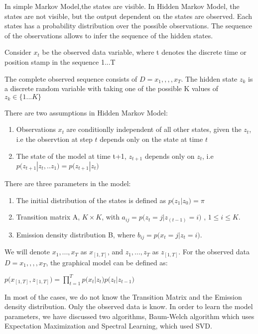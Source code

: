 \documentclass{article} %
\begin{document}
In simple Markov Model,the states are visible. In Hidden Markov Model, the states are not visible, but the output dependent on the states are observed. Each states has a probability distribution over the possible observations. The sequence of the observations allows to infer the sequence of the hidden states. 

Consider \(x_t\) be the observed data variable, where t denotes the discrete time or position stamp in the sequence 1...T

The complete observed sequence consists of \(D ={x_1,,,,x_T}\). The hidden state \(z_k\) is a discrete random variable with taking one of the possible K values of \(z_k \in \{1...K\}\)

There are two assumptions in Hidden Markov Model:
\begin{enumerate}
\item Observations $x_t$ are conditionlly independent of all other states, given the \(z_t\), i.e the observtion at step \(t\) depends only on the state at time \(t\)
\item The state of the model at time t+1, \(z_{t+1}\) depends only on \(z_t\), i.e 
\( p\big(z_{t+1}|z_t,..z_1\big) = p\big(z_{t+1}|z_t\big) \)
\end{enumerate}

There are three parameters in the model:
\begin{enumerate}
\item The initial distribution of the states is defined as \(p\big(z_1|z_0 \big) = \pi\)
\item Transition matrix A, \(K \times K \), with \(a_{ij} = p\big(z_t=j|z_(t-1)=i\big)\) , \(1\leq i \leq K \).
\item Emission density distribution B, where \(b_{ij} = p\big(x_t=j|z_t=i\big)\).
\end{enumerate}

We will denote \(x_1,...,x_T\) as \(x_{[1,T]}\), and \(z_1,...,z_T\) as \(z_{[1,T]}\). For the observed data \(D ={x_1,,,,x_T}\), the graphical model can be defined as:

\begin{center} \(  p\big( x_{[1,T]}, z_{[1,T]} \big) = \prod_{t=1}^{T}p\big(x_t|z_t\big)p\big(z_t|z_{t-1}\big)  \)
\end{center}

In most of the cases, we do not know the Transition Matrix and the Emission density distribution. Only
the observed data is know. In order to learn the model parameters, we have discussed two algorithms,
Baum-Welch algorithm which uses Expectation Maximization and Spectral Learning, which used SVD.
\end{document}
